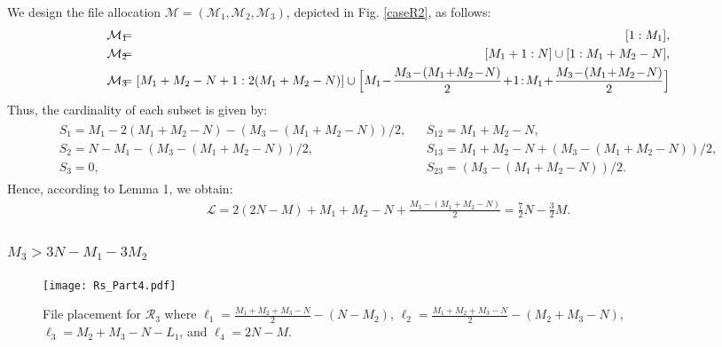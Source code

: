 \documentclass[conference]{IEEEtran}
\begin{document}
We design the file allocation $\mathcal{M}=(\mathcal{M}_1,\mathcal{M}_2,\mathcal{M}_3)$, depicted in Fig. \ref{caseR2}, as follows:
\begin{eqnarray}
\mathcal{M}_1&\!\!\!\!=\!\!\!\!&[1:M_1],\notag\\
\mathcal{M}_2&\!\!\!\!=\!\!\!\!&[M_1+1:N]\cup [1:M_1+M_2-N],\\
\mathcal{M}_3&\!\!\!\!=\!\!\!\!&[M_1+M_2-N+1:2(M_1+M_2-N)]\cup \Big[M_1\!-\!\frac{M_3\!-\!(M_1\!+\!M_2\!-\!N)}{2}\!+\!1\!:\!M_1\!+\!\frac{M_3\!-\!(M_1\!+\!M_2\!-\!N)}{2}\Big]\notag
\end{eqnarray}
Thus, the cardinality of each subset is given by:
\begin{eqnarray}
\begin{array}{lll}
S_1=M_1\!-2(M_1\!+M_2\!-N)\!-(M_3\!-(M_1\!+M_2\!-N))/2,&&S_{12} = M_1+M_2-N,\\
S_2=N-M_1-(M_3-(M_1+M_2-N))/2,&&S_{13} = M_1\!+M_2\!-N\!+(M_3\!-(M_1\!+M_2\!-N))/2,\\
S_3=0,&&S_{23} = (M_3-(M_1+M_2-N))/2.
\end{array}
\end{eqnarray}
Hence, according to Lemma 1, we obtain:
\begin{eqnarray}
{\mathcal L}=2(2N-M)+M_1+M_2-N+\frac{M_3-(M_1+M_2-N)}{2}=\frac{7}{2}N-\frac{3}{2}M.
\end{eqnarray}


\subsubsection{$M_3>3N-M_1-3M_2$}\label{case:3Meq2N}


\begin{figure}[!b] \centering %
\texttt{[image: Rs\_Part4.pdf]}\vspace{-0.2in}
\caption{File placement for ${\mathcal R}_3$ where ${\ell}_1=\frac{M_1+M_2+M_3-N}{2}-(N-M_2)$, ${\ell}_2=\frac{M_1+M_2+M_3-N}{2}-(M_2+M_3-N)$, ${\ell}_3=M_2+M_3-N-L_1$, and ${\ell}_4=2N-M$.}\label{caseR3}%
\end{figure}
\end{document}
